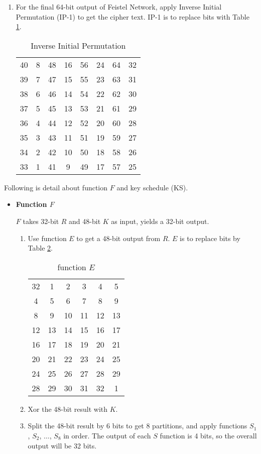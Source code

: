 \documentclass[12pt]{article}
\begin{document}
\begin{enumerate}
\begin{enumerate}
			\item
				For the final 64-bit output of Feistel Network, apply Inverse Initial Permutation (IP-1) to get the cipher text. IP-1 is to replace bits with Table \ref{tab:ip-1}.
				\begin{table}[hbtp]
					\centering
					\begin{tabular}{cccccccc}
						40 & 8 & 48 & 16 & 56 & 24 & 64 & 32\\
						39 & 7 & 47 & 15 & 55 & 23 & 63 & 31\\
						38 & 6 & 46 & 14 & 54 & 22 & 62 & 30\\
						37 & 5 & 45 & 13 & 53 & 21 & 61 & 29\\
						36 & 4 & 44 & 12 & 52 & 20 & 60 & 28\\
						35 & 3 & 43 & 11 & 51 & 19 & 59 & 27\\
						34 & 2 & 42 & 10 & 50 & 18 & 58 & 26\\
						33 & 1 & 41 &  9 & 49 & 17 & 57 & 25\\
					\end{tabular}
					\caption{Inverse Initial Permutation}
					\label{tab:ip-1}
				\end{table}
		\end{enumerate}

		Following is detail about function $F$ and key schedule (KS).

		\begin{itemize}
			\item
				\textbf{Function $F$}

				$F$ takes 32-bit $R$ and 48-bit $K$ as input, yields a 32-bit output.
				\begin{enumerate}
					\item
						Use function $E$ to get a 48-bit output from $R$. $E$ is to replace bits by Table \ref{tab:e}.
						\begin{table}[hbtp]
							\centering
							\begin{tabular}{cccccc}
								32 &  1 &  2 &  3 &  4 &  5\\
								 4 &  5 &  6 &  7 &  8 &  9\\
								 8 &  9 & 10 & 11 & 12 & 13\\
								12 & 13 & 14 & 15 & 16 & 17\\
								16 & 17 & 18 & 19 & 20 & 21\\
								20 & 21 & 22 & 23 & 24 & 25\\
								24 & 25 & 26 & 27 & 28 & 29\\
								28 & 29 & 30 & 31 & 32 &  1\\
							\end{tabular}
							\caption{function $E$}
							\label{tab:e}
						\end{table}
					\item Xor the 48-bit result with $K$.
					\item
						Split the 48-bit result by 6 bits to get 8 partitions, and apply functions $S_1$, $S_2$, $\ldots$, $S_8$ in order. The output of each $S$ function is 4 bits, so the overall output will be 32 bits.


\end{enumerate}
\end{itemize}
\end{enumerate}
\end{document}
